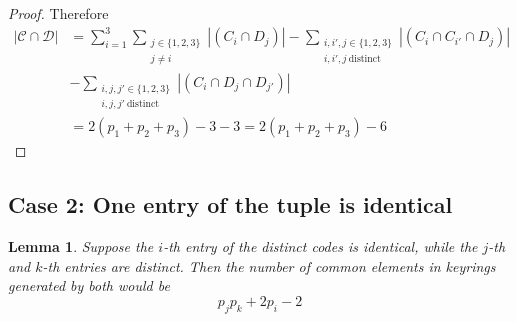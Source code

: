 \documentclass[12pt]{article}
\newtheorem{lemma}[theorem]{Lemma}
\theoremstyle{definition}
\theoremstyle{remark}
\begin{document}
\begin{proof}
    Therefore 
        \begin{align*}
        |\mathcal{C}\cap\mathcal{D}|&=\displaystyle\sum_{i=1}^{3}\displaystyle\sum_{\substack{j\in \{1,2,3\}\\j\neq i}}|(C_i\cap D_j)| -  \displaystyle\sum_{\substack{i,i',j \in \{1,2,3\}\\i,i',j~ \text{distinct}}}|(C_i \cap C_{i'} \cap D_j)|
        \\& - \displaystyle\sum_{\substack{i,j,j' \in \{1,2,3\}\\i,j,j'~ \text{distinct}}}|(C_i \cap D_{j} \cap D_{j'})| \\
        &=2(p_1+p_2+p_3) - 3 -3=2(p_1+p_2+p_3)-6
        \end{align*}
\end{proof}
\subsection{Case 2: One entry of the tuple is identical }
\begin{lemma}\label{le1}
    Suppose the $i$-th entry of the distinct codes is identical, while the $j$-th and $k$-th entries are distinct. Then the number of common elements in keyrings generated by both would be
        $$p_jp_k+2p_i-2$$
\end{lemma}
\end{document}
